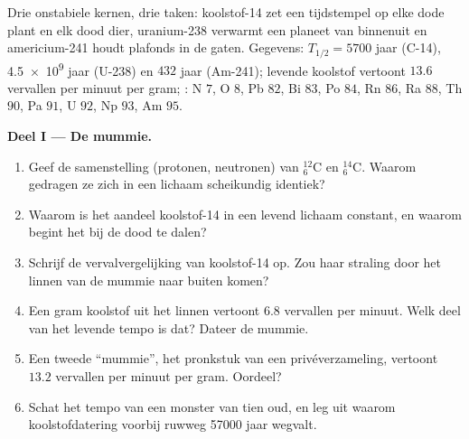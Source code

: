 \begin{problem}
\label{pb:g11:nucleus-radioactivity:1}
Drie onstabiele kernen, drie taken: koolstof-14 zet een tijdstempel op elke
dode plant en elk dood dier, uranium-238 verwarmt een planeet van binnenuit
en americium-241 houdt plafonds in de gaten. Gegevens:
$T_{1/2} = \num{5700}$ jaar (C-14), \num{4.5e9} jaar (U-238) en $432$ jaar
(Am-241); levende koolstof vertoont $13.6$ vervallen per minuut per gram;
: N $7$, O $8$, Pb $82$, Bi $83$, Po $84$, Rn $86$, Ra $88$,
Th $90$, Pa $91$, U $92$, Np $93$, Am $95$.

\medskip
\noindent\textbf{Deel I --- De mummie.}
\begin{enumerate}
  \item Geef de samenstelling (protonen, neutronen) van
        ${}^{12}_{6}\mathrm{C}$ en ${}^{14}_{6}\mathrm{C}$. Waarom
        gedragen ze zich in een lichaam scheikundig identiek?
  \item Waarom is het aandeel koolstof-14 in een levend lichaam constant,
        en waarom begint het bij de dood te dalen?
  \item Schrijf de vervalvergelijking van koolstof-14 op. Zou haar
        straling door het linnen van de mummie naar buiten komen?
  \item Een gram koolstof uit het linnen vertoont $6.8$ vervallen per
        minuut. Welk deel van het levende tempo is dat? Dateer de mummie.
  \item Een tweede ``mummie'', het pronkstuk van een privéverzameling,
        vertoont $13.2$ vervallen per minuut per gram. Oordeel?
  \item Schat het tempo van een monster van tien  oud, en
        leg uit waarom koolstofdatering voorbij ruwweg \num{57000} jaar
        wegvalt.
\end{enumerate}


\end{problem}
